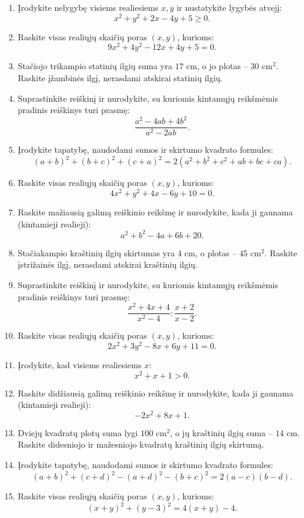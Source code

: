 \documentclass[11pt,a4paper]{article}
\begin{document}
\begin{enumerate}
\item Įrodykite nelygybę visiems realiesiems \(x,y\) ir nustatykite lygybės atvejį:\[x^2+y^2+2x-4y+5\ge0.\]
\item Raskite visas realiųjų skaičių poras \((x,y)\), kurioms:\[9x^2+4y^2-12x+4y+5=0.\]
\item Stačiojo trikampio statinių ilgių suma yra \(17\) cm, o jo plotas -- \(30\text{ cm}^2\). Raskite įžambinės ilgį, nerasdami atskirai statinių ilgių.
\item Suprastinkite reiškinį ir nurodykite, su kuriomis kintamųjų reikšmėmis pradinis reiškinys turi prasmę:\[\frac{a^2-4ab+4b^2}{a^2-2ab}.\]
\item Įrodykite tapatybę, naudodami sumos ir skirtumo kvadrato formules:\[(a+b)^2+(b+c)^2+(c+a)^2=2(a^2+b^2+c^2+ab+bc+ca).\]
\item Raskite visas realiųjų skaičių poras \((x,y)\), kurioms:\[4x^2+y^2+4x-6y+10=0.\]
\item Raskite mažiausią galimą reiškinio reikšmę ir nurodykite, kada ji gaunama (kintamieji realieji):\[a^2+b^2-4a+6b+20.\]
\item Stačiakampio kraštinių ilgių skirtumas yra \(4\) cm, o plotas -- \(45\text{ cm}^2\). Raskite įstrižainės ilgį, nerasdami atskirai kraštinių ilgių.
\item Suprastinkite reiškinį ir nurodykite, su kuriomis kintamųjų reikšmėmis pradinis reiškinys turi prasmę:\[\frac{x^2+4x+4}{x^2-4}:\frac{x+2}{x-2}.\]
\item Raskite visas realiųjų skaičių poras \((x,y)\), kurioms:\[2x^2+3y^2-8x+6y+11=0.\]
\item Įrodykite, kad visiems realiesiems \(x\):\[x^2+x+1>0.\]
\item Raskite didžiausią galimą reiškinio reikšmę ir nurodykite, kada ji gaunama (kintamieji realieji):\[-2x^2+8x+1.\]
\item Dviejų kvadratų plotų suma lygi \(100\text{ cm}^2\), o jų kraštinių ilgių suma -- \(14\) cm. Raskite didesniojo ir mažesniojo kvadratų kraštinių ilgių skirtumą.
\item Įrodykite tapatybę, naudodami sumos ir skirtumo kvadrato formules:\[(a+b)^2+(c+d)^2-(a+d)^2-(b+c)^2=2(a-c)(b-d).\]
\item Raskite visas realiųjų skaičių poras \((x,y)\), kurioms:\[(x+y)^2+(y-3)^2=4(x+y)-4.\]
\end{enumerate}
\clearpage
\end{document}
